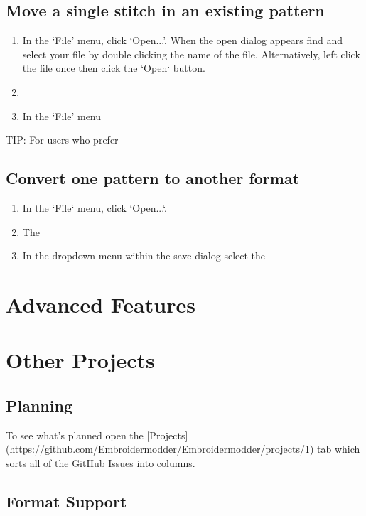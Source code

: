 \documentclass[a4paper, 11pt]{report}
\begin{document}
\subsection{Move a single stitch in an existing pattern}

\begin{enumerate}
\item In the `File' menu, click `Open...'. When the open dialog appears find
  and select your file by double clicking the name of the file. Alternatively,
  left click the file once then click the `Open` button.
\item
\item In the `File' menu
\end{enumerate}

TIP: For users who prefer

\subsection{Convert one pattern to another format}

\begin{enumerate}
\item In the `File` menu, click `Open...`.
\item The 
\item In the dropdown menu within the save dialog select the 
\end{enumerate}

\section{Advanced Features}

\section{Other Projects}


\subsection{Planning}

To see what's planned open the [Projects](https://github.com/Embroidermodder/Embroidermodder/projects/1) tab which sorts all of the GitHub Issues into columns.

\subsection{Format Support}
\end{document}
